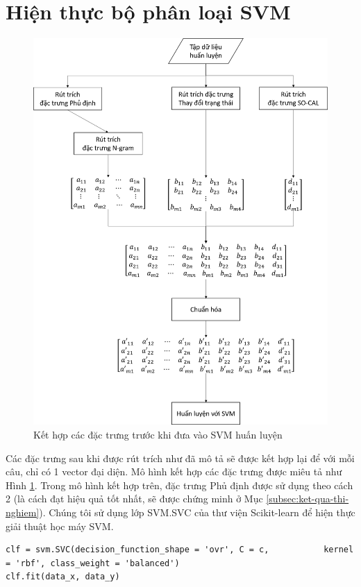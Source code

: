 \section{Hiện thực bộ phân loại SVM}
\begin{figure}[h]
\centering
\includegraphics[scale=0.25]{../hinh/kethopdactrung.png}
\caption{Kết hợp các đặc trưng trước khi đưa vào SVM huấn luyện} \label{fig:ket-hop-dac-trung}
\end{figure}
Các đặc trưng sau khi được rút trích như đã mô tả sẽ được kết hợp lại để với mỗi câu, chỉ có 1 vector đại diện. Mô hình kết hợp các đặc trưng được miêu tả như Hình \ref{fig:ket-hop-dac-trung}. Trong mô hình kết hợp trên, đặc trưng Phủ định được sử dụng theo cách 2 (là cách đạt hiệu quả tốt nhất, sẽ được chứng minh ở Mục \ref{subsec:ket-qua-thi-nghiem}). Chúng tôi sử dụng lớp SVM.SVC của thư viện Scikit-learn để hiện thực giải thuật học máy SVM.\\
\begin{minipage}{0.95\textwidth}
\begin{lstlisting}
clf = svm.SVC(decision_function_shape = 'ovr', C = c,           kernel = 'rbf', class_weight = 'balanced')
clf.fit(data_x, data_y)
\end{lstlisting}
\end{minipage}

